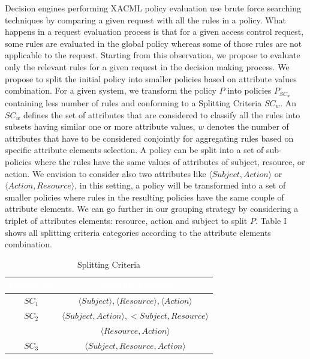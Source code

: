 Decision engines performing XACML policy evaluation use brute force searching techniques by comparing a given request with all the rules in a policy.
What happens in a request evaluation process is that for a given access control request, some rules are evaluated in the global policy whereas some of those rules are not
 applicable to the request. Starting from this observation, we propose to evaluate only the relevant rules for a given request in the decision making process. 
We propose to split the initial policy into smaller policies based on attribute values combination. For a given system, we transform the policy \normalsize $P$ into 
policies \normalsize $P_{SC_{w}}$ containing less number of rules and conforming to a Splitting Criteria $SC_{w}$. An $SC_{w}$ defines the set of attributes that are considered 
to classify all the rules into subsets having similar one or more attribute values, $w$ denotes the number of attributes that have to be considered conjointly for aggregating 
rules based on specific attribute elements selection. A policy can be split into a set of sub-policies where the rules have the same values of attributes of subject, resource, or 
action. We envision to consider also two attributes like $\langle Subject, Action\rangle$ or $\langle Action, Resource\rangle$, in this setting, a policy will be transformed into a set of smaller 
policies where rules in the resulting policies have the same couple of attribute elements. We can go further in our grouping strategy by considering a triplet of attributes
elements: resource, action and subject to split \normalsize $P$. Table I shows all splitting criteria categories according to the attribute elements combination.
\begin{table}[h!]
\centering
\setlength{\extrarowheight}{6 pt}
\begin{tabular}{|>{\small}c|>{\small}c|} 
\hline  \rowcolor{black} 
\bf
\textcolor{white}{Categories}& \bf \textcolor{white}{Splitting Criteria}\\ \hline
$SC_{1}$& {$\langle Subject \rangle, \langle Resource\rangle, \langle Action\rangle$}\\ \hline
$SC_{2}$& {$\langle Subject,Action \rangle, <Subject,Resource\rangle$}\\&{$\langle Resource,Action\rangle$}\\  \hline
$SC_{3}$& {$\langle Subject,Resource,Action\rangle$}\\ \hline
\end{tabular}
\caption{Splitting Criteria}
\label{table1}\end{table}


